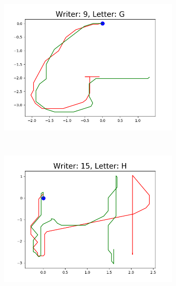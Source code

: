 \begin{figure}
\begin{subfigure}[b]{0.17\textwidth}
          \includegraphics[width=\textwidth]{images/framework/comparison_figures/G_9.png}
      \end{subfigure}
      ~
      \begin{subfigure}[b]{0.17\textwidth}
          \includegraphics[width=\textwidth]{images/framework/comparison_figures/H_15.png}
      \end{subfigure}
      ~
      \begin{subfigure}[b]{0.17\textwidth}

\end{subfigure}
\end{figure}
